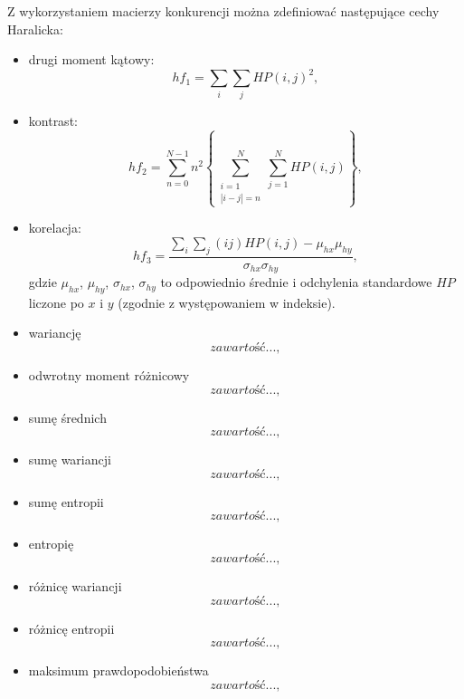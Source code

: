 Z wykorzystaniem macierzy konkurencji można zdefiniować następujące cechy Haralicka:
\begin{itemize}
	\item drugi moment kątowy:
	\begin{equation}
		hf_1 = \sum_i \sum_j {HP(i,j)}^2,
	\end{equation} 
	\item kontrast:
	\begin{equation}
		hf_2 = \sum_{n=0}^{N-1}n^2\left\{{\sum_{\substack{i=1\\|i-j|=n}}^{N} \sum_{j=1}^{N}} HP(i,j)\right\},
	\end{equation}  
	\item korelacja:
	\begin{equation}
		hf_3 = \frac{\sum_{i} \sum_{j}(ij)HP(i,j) - \mu_{hx}\mu_{hy}}{\sigma_{hx}\sigma_{hy}},
	\end{equation}
	gdzie $\mu_{hx}$, $\mu_{hy}$, $\sigma_{hx}$, $\sigma_{hy}$ to odpowiednio średnie i odchylenia standardowe $HP$ liczone po $x$ i $y$ (zgodnie z występowaniem w indeksie).  
	\item wariancję
	\begin{equation}
	zawartość...,
	\end{equation}
	\item odwrotny moment różnicowy
	\begin{equation}
	zawartość...,
	\end{equation} 
	\item sumę średnich
	\begin{equation}
	zawartość...,
	\end{equation} 
	\item sumę wariancji
	\begin{equation}
	zawartość...,
	\end{equation} 
	\item sumę entropii
	\begin{equation}
	zawartość...,
	\end{equation} 
	\item entropię
	\begin{equation}
	zawartość...,
	\end{equation} 
	\item różnicę wariancji
	\begin{equation}
	zawartość...,
	\end{equation} 
	\item różnicę entropii
	\begin{equation}
	zawartość...,
	\end{equation}
	\item maksimum prawdopodobieństwa
	\begin{equation}
	zawartość...,
	\end{equation}
\end{itemize}
